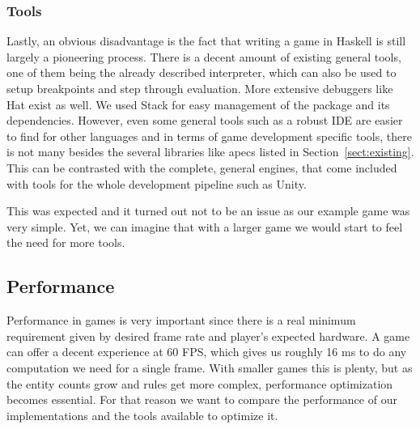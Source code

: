 \documentclass[
  digital, %
  color,   %
  table,   %
  oneside, %
  lof,     %
  lot,     %
]{fithesis3}
\begin{document}
{\subsubsection{Tools}
Lastly, an obvious disadvantage is the fact that writing a game in Haskell
is still largely a pioneering process. There is a decent amount of existing general tools,
one of them being the already described interpreter,
which can also be used to setup breakpoints and step through evaluation.
More extensive debuggers like Hat exist as well. We used Stack for easy management of
the package and its dependencies. However, even some general tools such as a robust IDE
are easier to find for other languages and in terms of game development specific tools,
there is not many besides the several libraries like apecs listed in Section~\ref{sect:existing}.
This can be contrasted with the complete, general engines, that come included with 
tools for the whole development pipeline such as Unity.

This was expected and it turned out not to be an issue as our example game was
very simple. Yet, we can imagine that with a larger game we would start
to feel the need for more tools.



\subsection{Performance}

Performance in games is very important since there is a real minimum requirement
given by desired frame rate and player's expected hardware. A game can offer
a decent experience at 60 FPS, which gives us roughly 16 ms to do any computation
we need for a single frame. With smaller games this is plenty, but as the entity
counts grow and rules get more complex, performance optimization becomes essential.
For that reason we want to compare the performance of our implementations and
the tools available to optimize it.

}
\end{document}
